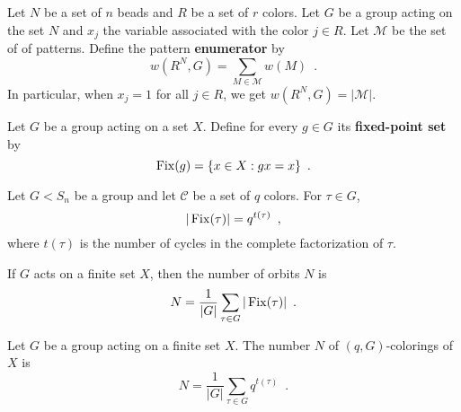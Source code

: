 \begin{definition}
	\cite[85]{Aigner2007}
	Let $N$ be a set of $n$ beads and $R$ be a set of $r$ colors. Let $G$ be a group acting
	on the set $N$ and $x_j$ the variable associated with the color $j \in R$. Let
	$\mathcal{M}$ be the set of of patterns. Define the pattern \textbf{enumerator} by
	\begin{equation}
		w(R^N, G) = \sum_{M \in \mathcal{M}} w(M) \enspace.
	\end{equation}
	In particular, when $x_j = 1$ for all $j \in R$, we get $w(R^N, G) = |\mathcal{M}|$.
\end{definition}

\begin{definition}
	\cite[86]{Aigner2007}
	Let $G$ be a group acting on a set $X$. Define for every $g \in G$ its
	\textbf{fixed-point set} by 
	\begin{equation}
		\operatorname{Fix}(g) = \{ x \in X : gx = x \} \enspace.
	\end{equation}
\end{definition}

\begin{lemma}
	\cite[112]{Rotman1967}
	Let $G < S_n$ be a group and let $\mathcal{C}$ be a set of $q$ colors. For $\tau \in G$,
	\begin{equation}
		|\operatorname{Fix}(\tau)| = q^{t(\tau)} \enspace,
	\end{equation}
	where $t(\tau)$ is the number of cycles in the complete factorization of $\tau$.
\end{lemma}

\begin{lemma}[Burnside]
	\cite[109]{Rotman1967}
	\cite[251]{Tucker1974}
	If $G$ acts on a finite set $X$, then the number of orbits $N$ is
	\begin{equation}
		N = \frac{1}{|G|} \sum_{\tau \in G} |\operatorname{Fix}(\tau)| \enspace.
	\end{equation}
\end{lemma}

\begin{corollary}
	\cite[112]{Rotman1967}
	Let $G$ be a group acting on a finite set $X$. The number $N$ of $(q, G)$-colorings
	of $X$ is
	\begin{equation}
		N = \frac{1}{|G|} \sum_{\tau \in G} q^{t(\tau)} \enspace.
	\end{equation}
\end{corollary}

